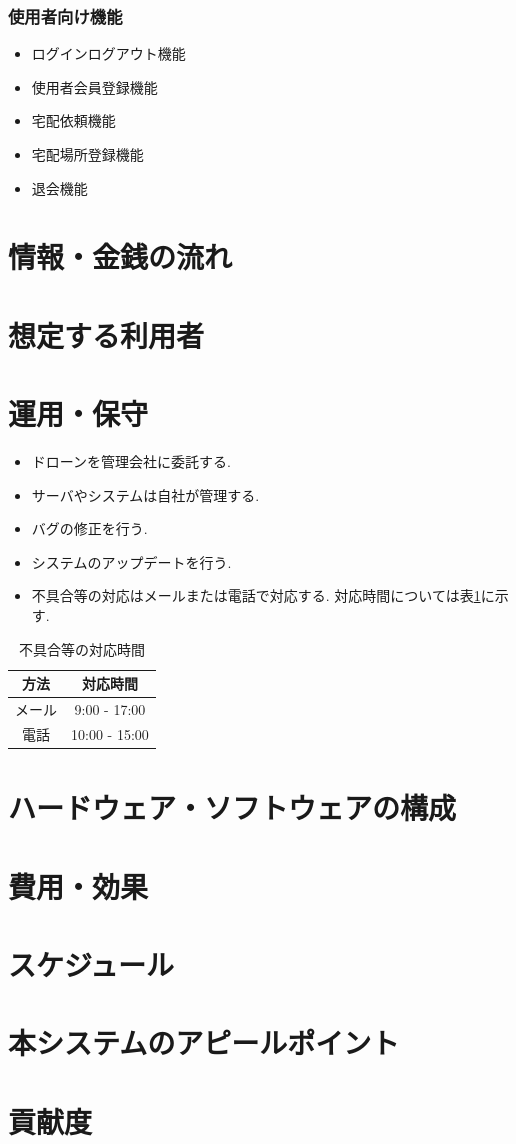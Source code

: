 \documentclass[a4paper, titlepage]{jsarticle}
\begin{document}
\subsubsection{使用者向け機能}
\begin{itemize}
    \item ログインログアウト機能
    \item 使用者会員登録機能
    \item 宅配依頼機能
    \item 宅配場所登録機能
    \item 退会機能
\end{itemize}
\section{情報・金銭の流れ}

\section{想定する利用者}

\section{運用・保守}
\begin{itemize}
\item ドローンを管理会社に委託する.
\item サーバやシステムは自社が管理する.
\item バグの修正を行う.
\item システムのアップデートを行う.
\item 不具合等の対応はメールまたは電話で対応する. 対応時間については表\ref{tb:huguai}に示す.
\end{itemize}

\begin{table}[htbp]
  \centering
  \begin{tabular}{c|c} \hline
    方法 & 対応時間 \\ \hline
    メール & 9:00 - 17:00 \\
    電話 & 10:00 - 15:00 \\ \hline
  \end{tabular}
  \caption{不具合等の対応時間}
  \label{tb:huguai}
\end{table}

\section{ハードウェア・ソフトウェアの構成}

\section{費用・効果}

\section{スケジュール}

\section{本システムのアピールポイント}

\section{貢献度}
\end{document}
